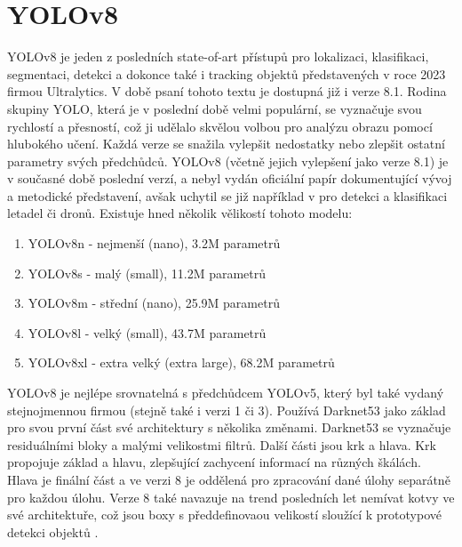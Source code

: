 \section{YOLOv8}
\label{sec:Chapter26}
YOLOv8 je jeden z posledních state-of-art přístupů pro lokalizaci, klasifikaci, segmentaci, detekci a dokonce také i tracking objektů představených v roce 2023 firmou Ultralytics. V době psaní tohoto textu je dostupná již i verze 8.1. Rodina skupiny YOLO, která je v poslední době velmi populární, se vyznačuje svou rychlostí a přesností, což ji udělalo skvělou volbou pro analýzu obrazu pomocí hlubokého učení. Každá verze se snažila vylepšit nedostatky nebo zlepšit ostatní parametry svých předchůdců. YOLOv8 (včetně jejich vylepšení jako verze 8.1) je v současné době poslední verzí, a nebyl vydán oficiální papír dokumentující vývoj a metodické představení, avšak uchytil se již například v \cite{yoloplane} pro detekci a klasifikaci letadel či dronů. Existuje hned několik vělikostí tohoto modelu:
\begin{enumerate}
  \item YOLOv8n - nejmenší (nano), 3.2M parametrů
  \item YOLOv8s - malý (small), 11.2M parametrů
  \item YOLOv8m - střední (nano), 25.9M parametrů
  \item YOLOv8l - velký (small), 43.7M parametrů
  \item YOLOv8xl - extra velký (extra large), 68.2M parametrů
\end{enumerate}

YOLOv8 je nejlépe srovnatelná s předchůdcem YOLOv5, který byl také vydaný stejnojmennou firmou (stejně také i verzi 1 či 3). Používá Darknet53 \cite{darknet} jako základ pro svou první část své architektury s několika změnami. Darknet53 se vyznačuje residuálními bloky a malými velikostmi filtrů. Další části jsou krk a hlava. Krk propojuje základ a hlavu, zlepšující zachycení informací na různých škálách. Hlava je finální část a ve verzi 8 je oddělená pro zpracování dané úlohy separátně pro každou úlohu. Verze 8 také navazuje na trend posledních let nemívat kotvy ve své architektuře, což jsou boxy s předdefinovaou velikostí sloužící k prototypové detekci objektů \cite{yoloplane}.


\endinput